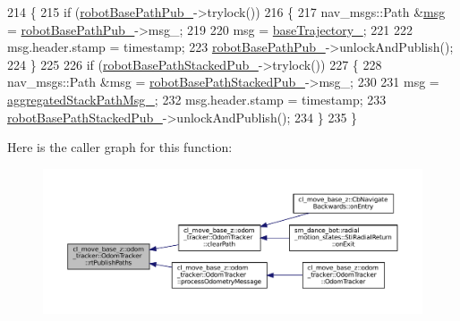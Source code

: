 \begin{DoxyCode}
214         \{
215             \textcolor{keywordflow}{if} (\hyperlink{classcl__move__base__z_1_1odom__tracker_1_1OdomTracker_a40a7cbb6bb6595e250e7c685c781613b}{robotBasePathPub\_}->trylock())
216             \{
217                 nav\_msgs::Path &\hyperlink{namespacebattery__monitor__node_ab1920c64448816edd4064e494275fdff}{msg} = \hyperlink{classcl__move__base__z_1_1odom__tracker_1_1OdomTracker_a40a7cbb6bb6595e250e7c685c781613b}{robotBasePathPub\_}->msg\_;
219 
220                 msg = \hyperlink{classcl__move__base__z_1_1odom__tracker_1_1OdomTracker_a466d18a86df049f0f680e043bb5ea91f}{baseTrajectory\_};
221 
222                 msg.header.stamp = timestamp;
223                 \hyperlink{classcl__move__base__z_1_1odom__tracker_1_1OdomTracker_a40a7cbb6bb6595e250e7c685c781613b}{robotBasePathPub\_}->unlockAndPublish();
224             \}
225 
226             \textcolor{keywordflow}{if} (\hyperlink{classcl__move__base__z_1_1odom__tracker_1_1OdomTracker_a7a2fb23e835ba7d63e69c8db819be876}{robotBasePathStackedPub\_}->trylock())
227             \{
228                 nav\_msgs::Path &msg = \hyperlink{classcl__move__base__z_1_1odom__tracker_1_1OdomTracker_a7a2fb23e835ba7d63e69c8db819be876}{robotBasePathStackedPub\_}->msg\_;
230 
231                 msg = \hyperlink{classcl__move__base__z_1_1odom__tracker_1_1OdomTracker_a0fb60113ace2791a1f1bbeed59946404}{aggregatedStackPathMsg\_};
232                 msg.header.stamp = timestamp;
233                 \hyperlink{classcl__move__base__z_1_1odom__tracker_1_1OdomTracker_a7a2fb23e835ba7d63e69c8db819be876}{robotBasePathStackedPub\_}->unlockAndPublish();
234             \}
235         \}
\end{DoxyCode}
Here is the caller graph for this function\+:
\nopagebreak
\begin{figure}[H]
\begin{center}
\leavevmode
\includegraphics[width=350pt]{classcl__move__base__z_1_1odom__tracker_1_1OdomTracker_a8f728f85d1f3f49f4b94e37052a59d6d_icgraph}
\end{center}
\end{figure}
\mbox{\label{classcl__move__base__z_1_1odom__tracker_1_1OdomTracker_a3b3cf9010e4e4fe4f96cfafd5a529517}} 
